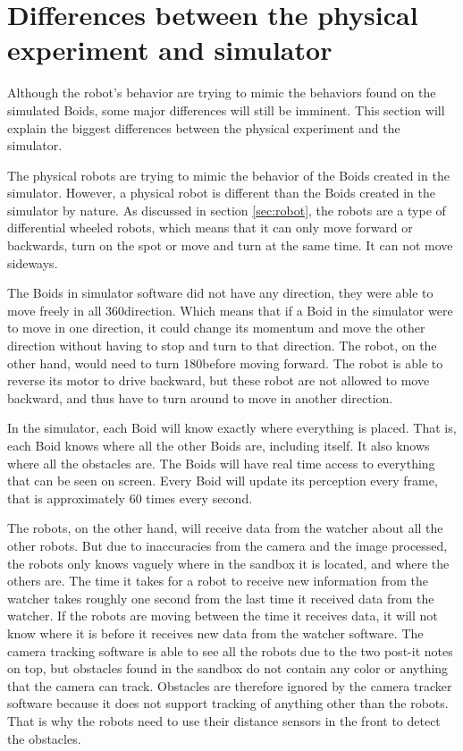 
\section{Differences between the physical experiment and simulator}
Although the robot's behavior are trying to mimic the behaviors found on the simulated Boids, some major differences will still be imminent. This section will explain the biggest differences between the physical experiment and the simulator. 

The physical robots are trying to mimic the behavior of the Boids created in the simulator. However, a physical robot is different than the Boids created in the simulator by nature. As discussed in section \ref{sec:robot}, the robots are a type of differential wheeled robots, which means that it can only move forward or backwards, turn on the spot or move and turn at the same time. It can not move sideways.

The Boids in simulator software did not have any direction, they were able to move freely in all 360\textdegree direction. Which means that if a Boid in the simulator were to move in one direction, it could change its momentum and move the other direction without having to stop and turn to that direction. The robot, on the other hand, would need to turn 180\textdegree before moving forward. The robot is able to reverse its motor to drive backward, but these robot are not allowed to move backward, and thus have to turn around to move in another direction.

In the simulator, each Boid will know exactly where everything is placed. That is, each Boid knows where all the other Boids are, including itself. It also knows where all the obstacles are. The Boids will have real time access to everything that can be seen on screen. Every Boid will update its perception every frame, that is approximately 60 times every second.

The robots, on the other hand, will receive data from the watcher about all the other robots. But due to inaccuracies from the camera and the image processed, the robots only knows vaguely where in the sandbox it is located, and where the others are. The time it takes for a robot to receive new information from the watcher takes roughly one second from the last time it received data from the watcher. If the robots are moving between the time it receives data, it will not know where it is before it receives new data from the watcher software. The camera tracking software is able to see all the robots due to the two post-it notes on top, but obstacles found in the sandbox do not contain any color or anything that the camera can track. Obstacles are therefore ignored by the camera tracker software because it does not support tracking of anything other than the robots. That is why the robots need to use their distance sensors in the front to detect the obstacles.

